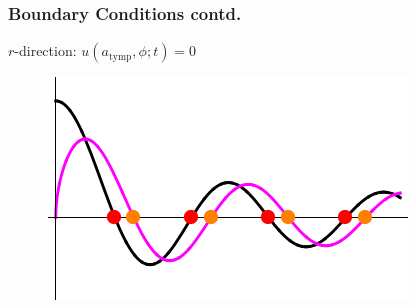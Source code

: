 \documentclass{beamer}
\begin{document}
\begin{frame}[t]
 \frametitle{Boundary Conditions contd.}
%      
% 
 \begin{exampleblock}{$r$-direction: $u(a_{\mathrm{tymp}},\phi;t)=0$}
\begin{figure}[h!]
      \centering
      \includegraphics[width = 5.5 cm]{Diagrams/Presentation/BoundaryConditions/besselzeros.png}
 \end{figure}
 \end{exampleblock}

\end{frame}
\end{document}
